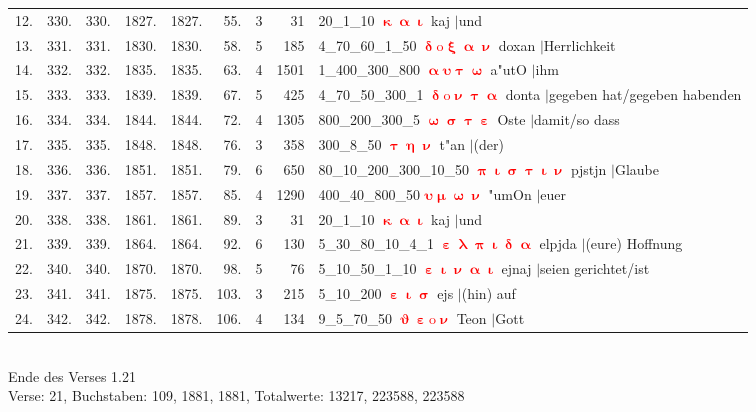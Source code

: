 \documentclass[a4paper,10pt,landscape]{article}
\begin{document}
\begin{tabular}{rrrrrrrrp{120mm}}
12.&330.&330.&1827.&1827.&55.&3&31&20\_1\_10 \textcolor{red}{$\boldsymbol{\upkappa\upalpha\upiota}$} kaj $|$und\\
13.&331.&331.&1830.&1830.&58.&5&185&4\_70\_60\_1\_50 \textcolor{red}{$\boldsymbol{\updelta\mathrm{o}\upxi\upalpha\upnu}$} doxan $|$Herrlichkeit\\
14.&332.&332.&1835.&1835.&63.&4&1501&1\_400\_300\_800 \textcolor{red}{$\boldsymbol{\upalpha\upsilon\uptau\upomega}$} a"utO $|$ihm\\
15.&333.&333.&1839.&1839.&67.&5&425&4\_70\_50\_300\_1 \textcolor{red}{$\boldsymbol{\updelta\mathrm{o}\upnu\uptau\upalpha}$} donta $|$gegeben hat/gegeben habenden\\
16.&334.&334.&1844.&1844.&72.&4&1305&800\_200\_300\_5 \textcolor{red}{$\boldsymbol{\upomega\upsigma\uptau\upepsilon}$} Oste $|$damit/so dass\\
17.&335.&335.&1848.&1848.&76.&3&358&300\_8\_50 \textcolor{red}{$\boldsymbol{\uptau\upeta\upnu}$} t"an $|$(der)\\
18.&336.&336.&1851.&1851.&79.&6&650&80\_10\_200\_300\_10\_50 \textcolor{red}{$\boldsymbol{\uppi\upiota\upsigma\uptau\upiota\upnu}$} pjstjn $|$Glaube\\
19.&337.&337.&1857.&1857.&85.&4&1290&400\_40\_800\_50 \textcolor{red}{$\boldsymbol{\upsilon\upmu\upomega\upnu}$} "umOn $|$euer\\
20.&338.&338.&1861.&1861.&89.&3&31&20\_1\_10 \textcolor{red}{$\boldsymbol{\upkappa\upalpha\upiota}$} kaj $|$und\\
21.&339.&339.&1864.&1864.&92.&6&130&5\_30\_80\_10\_4\_1 \textcolor{red}{$\boldsymbol{\upepsilon\uplambda\uppi\upiota\updelta\upalpha}$} elpjda $|$(eure) Hoffnung\\
22.&340.&340.&1870.&1870.&98.&5&76&5\_10\_50\_1\_10 \textcolor{red}{$\boldsymbol{\upepsilon\upiota\upnu\upalpha\upiota}$} ejnaj $|$seien gerichtet/ist\\
23.&341.&341.&1875.&1875.&103.&3&215&5\_10\_200 \textcolor{red}{$\boldsymbol{\upepsilon\upiota\upsigma}$} ejs $|$(hin) auf\\
24.&342.&342.&1878.&1878.&106.&4&134&9\_5\_70\_50 \textcolor{red}{$\boldsymbol{\upvartheta\upepsilon\mathrm{o}\upnu}$} Teon $|$Gott\\
\end{tabular}\medskip \\
Ende des Verses 1.21\\
Verse: 21, Buchstaben: 109, 1881, 1881, Totalwerte: 13217, 223588, 223588\\
\\
\end{document}
